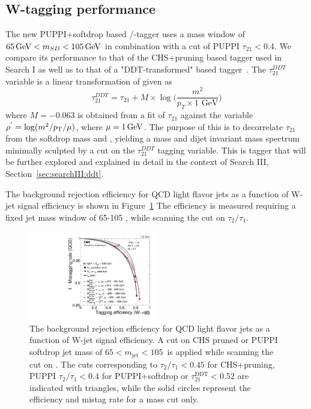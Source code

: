 \subsection{W-tagging performance}
The new PUPPI+softdrop based \PW/\PZ-tagger uses a mass window of $65 \,\text{Ge\hspace{-.08em}V} < m_{SD} < 105 \,\text{Ge\hspace{-.08em}V}$ in combination with a cut of PUPPI $\tau_{21}<0.4$.
We compare its performance to that of the CHS+pruning based tagger used in Search I as well as to that of a "DDT-transformed" \nsubj based tagger~\cite{Dolen:2016kst}. The $\tau_{21}^{DDT}$ variable is a linear transformation of \nsubj given as
\begin{equation}
\tau_{21}^{DDT} = \tau_{21} + M \times \log \bigg( \frac{m^2}{p_T \times 1 \textrm{ GeV}}\bigg)
\end{equation}
where $M=-0.063$ is obtained from a fit of $\tau_{21}$ against the variable $\rho^{'}=\log(m^2/p_{\mathrm{T}}/\mu)$, where $\mu = 1 \,\text{Ge\hspace{-.08em}V}$.
The purpose of this is to decorrelate $\tau_{21}$ from the softdrop mass and \PT, yielding a mass and dijet invariant mass spectrum minimally sculpted by
a cut on the $\tau_{21}^{DDT}$ tagging variable. This is tagger that will be further explored and explained in detail in the context of Search III, Section~\ref{sec:searchIII:ddt}.\par
The background rejection efficiency for QCD light flavor jets as a function of W-jet signal efficiency is shown in Figure~\ref{fig:searchII:roc}
The efficiency is measured requiring a fixed jet mass window of 65-105 \GeV, while scanning the cut on $\tau_2/\tau_1$.

\begin{figure}[htbp]
\centering
\includegraphics[width=0.49\textwidth]{figures/vtagging/JME-16-003/BoostedW/roc_WqqvsQCD_2bins.pdf}
\caption{The background rejection efficiency for QCD light flavor jets as a function of W-jet signal efficiency. A cut on CHS pruned or PUPPI softdrop jet
mass of $65<m_{\mathrm{jet}}<105$~\GeV is applied while scanning the cut on \nsubj. The cuts corresponding to $\tau_2/\tau_1 < 0.45$ for CHS+pruning, PUPPI $\tau_2/\tau_1 < 0.4$ for PUPPI+softdrop or $\tau_{21}^\text{DDT}<0.52$ are indicated with triangles, while the solid circles represent the efficiency and mistag rate for a mass cut only.
}
\label{fig:searchII:roc}
\end{figure}

